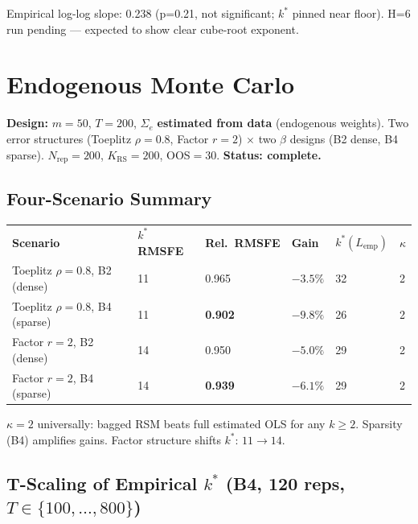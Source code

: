 \documentclass[11pt,a4paper]{article}
\newcommand{\ck}[1]{\textcolor{mygreen}{\textbf{#1}}}
\newcommand{\kstar}{k^*}
\newcommand{\Sige}{\Sigma_e}
\begin{document}
\smallskip\noindent
{\small\color{dgrey}Empirical log-log slope: 0.238 (p=0.21, not significant; \(\kstar\) pinned near floor).
H=6 run pending — expected to show clear cube-root exponent.}

\section{Endogenous Monte Carlo}

\noindent\textbf{Design:} \(m=50\), \(T=200\), \(\Sige\) \textbf{estimated from data} (endogenous weights).
Two error structures (Toeplitz \(\rho=0.8\), Factor \(r=2\)) \(\times\) two \(\beta\) designs (B2 dense, B4 sparse).
\(N_{\mathrm{rep}}=200\), \(K_{\mathrm{RS}}=200\), OOS\(=30\).
\textbf{Status: complete.}

\subsection{Four-Scenario Summary}

\smallskip
\begin{tabular}{L{4.0cm} C{1.3cm} C{1.3cm} C{1.1cm} C{1.5cm} C{0.7cm}}
\color{white}\bfseries Scenario &
\color{white}\bfseries \(\kstar\) RMSFE &
\color{white}\bfseries Rel.\ RMSFE &
\color{white}\bfseries Gain &
\color{white}\bfseries \(\kstar(L_{\mathrm{emp}})\) &
\color{white}\bfseries \(\kappa\) \\
Toeplitz \(\rho=0.8\), B2 (dense)  & 11 & 0.965 & \(-3.5\%\) & 32 & 2 \\
Toeplitz \(\rho=0.8\), B4 (sparse) & 11 & \ck{0.902} & \ck{\(-9.8\%\)} & 26 & 2 \\
Factor \(r=2\), B2 (dense)  & 14 & 0.950 & \(-5.0\%\) & 29 & 2 \\
Factor \(r=2\), B4 (sparse) & 14 & \ck{0.939} & \ck{\(-6.1\%\)} & 29 & 2 \\
\end{tabular}

\smallskip\noindent
{\small\color{dgrey}\(\kappa=2\) universally: bagged RSM beats full estimated OLS for any \(k\ge2\).
Sparsity (B4) amplifies gains. Factor structure shifts \(\kstar\): \(11\to14\).}

\subsection{T-Scaling of Empirical \(\kstar\) (B4, 120 reps, \(T\in\{100,\ldots,800\}\))}
\end{document}
